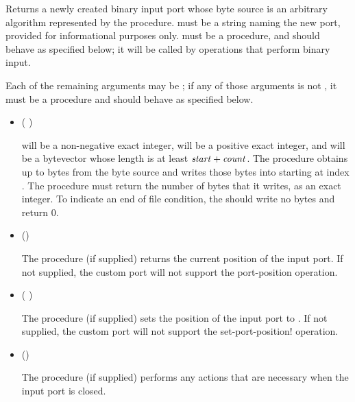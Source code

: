 \begin{entry}{%
}

Returns a newly created binary input port whose byte source is
an arbitrary algorithm represented by the  procedure.
 must be a string naming the new port,
provided for informational purposes only.
 must be a procedure, and should behave as specified
below; it will be called by operations that perform binary input.

Each of the remaining arguments may be \schfalse{}; if any of
those arguments is not \schfalse{}, it must be a procedure and
should behave as specified below.
   
\begin{itemize}
\item {\cf (   )}
       
   will be a non-negative exact integer,
   will be a positive exact integer,
  and  will be a bytevector whose length is at least
  $\textnormal{\textit{start}} + \textnormal{\textit{count}}$.
  The  procedure obtains up to  bytes
  from the byte source and writes those bytes
  into  starting at index .
  The  procedure must return the number of bytes
  that it writes, as an exact integer.
  To indicate an end of file condition, the 
  should write no bytes and return 0.

\item {\cf ()}
       
  The  procedure (if supplied)
  returns the current position of the input port.
  If not supplied, the custom port will not support
  the {\cf port-position} operation.
  
\item {\cf ( )}
       
  The  procedure (if supplied) sets the position
  of the input port to .
  If not supplied, the custom port will not support
  the {\cf set-port-position!} operation.
       
\item {\cf ()}
       
  The  procedure (if supplied) performs any
  actions that are necessary when the input port is closed.


\end{itemize}
\end{entry}
